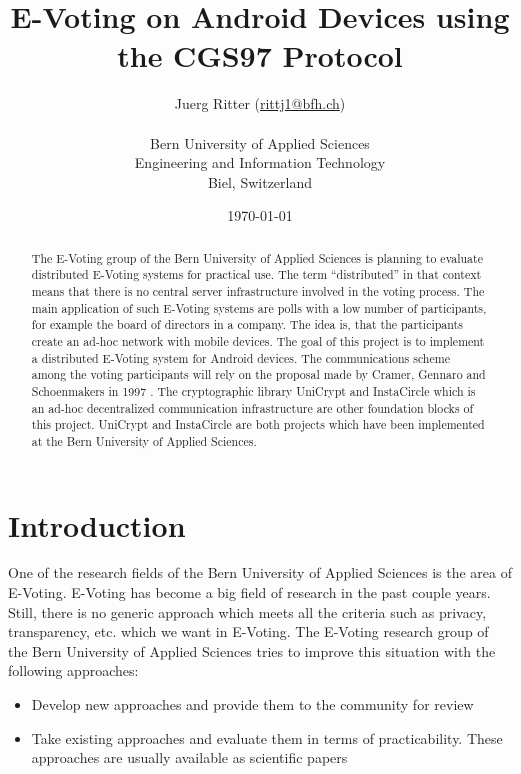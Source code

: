 \documentclass[numbers=noenddot, abstract=on]{scrreprt}
\begin{document}
\title{\bf E-Voting on Android Devices using the CGS97 Protocol}
\subject{Master Thesis Proposal}
\author{Juerg Ritter (\url{rittj1@bfh.ch})\\
\\
Bern University of Applied Sciences\\
Engineering and Information Technology\\
Biel, Switzerland\\}
\date{\today}
\publishers{Advisor: Prof. Dr. Rolf Haenni, Bern University of Applied
Sciences\\
Expert: Stephan Neumann, Technical University of Darmstadt}
\maketitle




\begin{abstract}
The E-Voting group of the Bern University of Applied Sciences is planning to
evaluate distributed E-Voting systems for practical use. The term
``distributed'' in that context means that there is no central server
infrastructure involved in the voting process. The main application of such
E-Voting systems are polls with a low number of participants, for example the
board of directors in a company. The idea is, that the participants create an
ad-hoc network with mobile devices. The goal of this project is to implement a
distributed E-Voting system for Android devices. The communications scheme among
the voting participants will rely on the proposal made by Cramer, Gennaro and
Schoenmakers in 1997 \cite{CGS97}. The cryptographic library UniCrypt and
InstaCircle which is an ad-hoc decentralized communication infrastructure are
other foundation blocks of this project. UniCrypt and InstaCircle are both
projects which have been implemented at the Bern University of Applied Sciences.
\end{abstract}

\tableofcontents

\chapter{Introduction}
\label{cha:introduction}
One of the research fields of the Bern University of Applied Sciences is the
area of E-Voting. E-Voting has become a big field of research in the past couple
years. Still, there is no generic approach which meets all the criteria such as
privacy, transparency, etc. which we want in E-Voting. The E-Voting research
group of the Bern University of Applied Sciences \cite{www:EVG} tries to improve
this situation with the following approaches:
\begin{itemize}
  \item Develop new approaches and provide them to the community for review
  \item Take existing approaches and evaluate them in terms of practicability.
  These approaches are usually available as scientific papers
\end{itemize}
\end{document}
